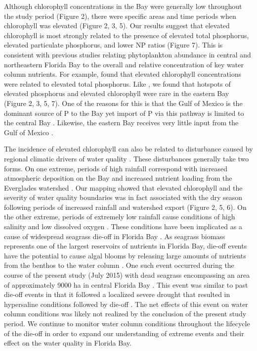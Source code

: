 Although chlorophyll concentrations in the Bay were generally low throughout the study period (Figure 2), there were specific areas and time periods when chlorophyll was elevated (Figure 2, 3, 5). Our results suggest that elevated chlorophyll is most strongly related to the presence of elevated total phosphorus, elevated particulate phosphorus, and lower NP ratios (Figure 7). This is consistent with previous studies relating phytoplankton abundance in central and northeastern Florida Bay to the overall and relative concentration of key water column nutrients. For example, \citet{fourqurean1993process} found that elevated chlorophyll concentrations were related to elevated total phosphorus. Like \citet{fourqurean1993process}, we found that hotspots of elevated phosphorus and elevated chlorophyll were rare in the eastern Bay (Figure 2, 3, 5, 7). One of the reasons for this is that the Gulf of Mexico is the dominant source of P to the Bay yet import of P via this pathway is limited to the central Bay \citep{childers_relating_2006, rudnick1999phosphorus}. Likewise, the eastern Bay receives very little input from the Gulf of Mexico \citep{lee2016circulation}. 

The incidence of elevated chlorophyll can also be related to disturbance caused by regional climatic drivers of water quality \citep{davis2004importance, briceno_climatic_2009}. These disturbances generally take two forms. On one extreme, periods of high rainfall correspond with increased atmospheric deposition on the Bay and increased nutrient loading from the Everglades watershed \citep{rudnick1999phosphorus,sutula2003factors}. Our mapping showed that elevated chlorophyll and the severity of water quality boundaries was in fact associated with the dry season following periods of increased rainfall and watershed export (Figure 2, 5, 6). On the other extreme, periods of extremely low rainfall cause conditions of high salinity and low dissolved oxygen \citep{hall2016recurrence}. These conditions have been implicated as a cause of widespread seagrass die-off in Florida Bay \citep{borum2005potential, zieman1999seagrass}. As seagrass biomass represents one of the largest reservoirs of nutrients in Florida Bay, die-off events have the potential to cause algal blooms by releasing large amounts of nutrients from the benthos to the water column \citep{fourqurean2012carbon, zhang2004potential}. One such event occurred during the course of the present study (July 2015) with dead seagrass encompassing an area of approximately 9000 ha in central Florida Bay \citep{hall2016recurrence}. This event was similar to past die-off events in that it followed a localized severe drought that resulted in hypersaline conditions followed by die-off \citep[Figure 4, ][]{robblee1991mass}. The net effects of this event on water column conditions was likely not realized by the conclusion of the present study period. We continue to monitor water column conditions throughout the lifecycle of the die-off in order to expand our understanding of extreme events and their effect on the water quality in Florida Bay.


